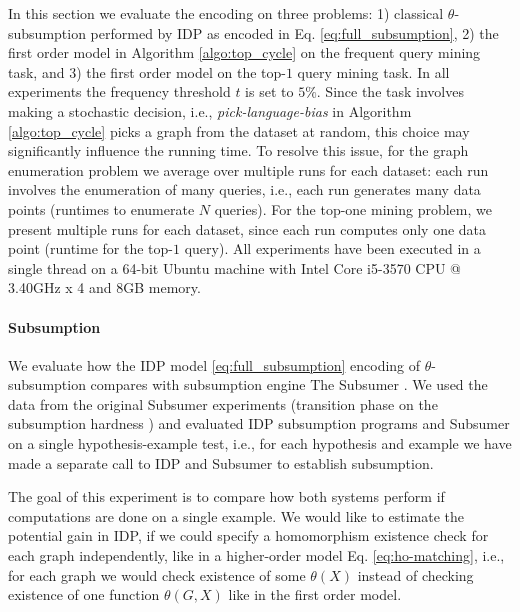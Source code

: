 In this section we evaluate the encoding on three problems: 1) classical $\theta$-subsumption performed by IDP as encoded in Eq. \ref{eq:full_subsumption}, 2) the first order model in Algorithm \ref{algo:top_cycle} on the frequent query mining task, and 3) the first order model on the top-$1$ query mining task. In all experiments the frequency threshold $t$ is set to $5\%$.
Since the task involves making a stochastic decision, i.e., \textit{pick-language-bias} in Algorithm \ref{algo:top_cycle} picks a graph from the dataset at random, this choice may significantly influence the running time. To resolve this issue, for the graph enumeration problem we average over multiple runs for each dataset: each run involves the enumeration of many queries, i.e., each run generates many data points (runtimes to enumerate $N$ queries). 
For the top-one mining problem, we present multiple runs for each dataset, since each run computes only one data point (runtime for the top-$1$ query). All experiments have been executed in a single thread on a 64-bit Ubuntu machine with Intel Core i5-3570 CPU @ 3.40GHz x 4 and 8GB memory.

\paragraph{Subsumption}
We evaluate how the IDP model \ref{eq:full_subsumption} encoding of $\theta$-subsumption compares with subsumption engine The Subsumer \parencite{subsumer}. We used the data from the original Subsumer experiments (transition phase on the subsumption hardness \cite[p. 327]{luc_book}) and evaluated IDP subsumption programs and Subsumer on a single hypothesis-example test, i.e., for each hypothesis and example we have made a separate call to IDP and Subsumer to establish subsumption.

The goal of this experiment is to compare how both systems perform if computations are done on a single example. We would like to estimate the potential gain in IDP, if we could specify a homomorphism existence check for each graph independently, like in a higher-order model Eq. \ref{eq:ho-matching}, i.e., for each graph we would check existence of some $\theta(X)$ instead of checking existence of one function $\theta(G,X)$ like in the first order model.

